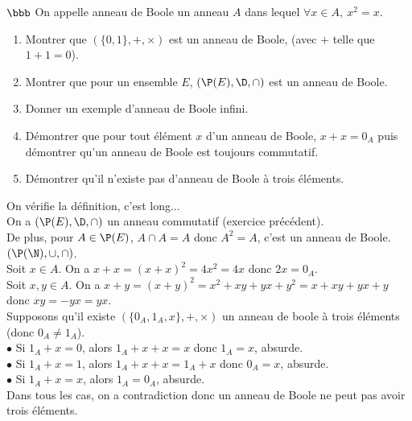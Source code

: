 \documentclass[11pt]{article}
\begin{document}
\begin{exercice}{$\bbb$}{}
    On appelle anneau de Boole un anneau $A$ dans lequel $\forall x \in A, ~ x^2 = x$.
    \begin{enumerate}
        \item Montrer que $(\{0,1\},+,\times)$ est un anneau de Boole, (avec $+$ telle que $1+1=0$).
        \item Montrer que pour un ensemble $E$, $(\P(E),\D,\cap)$ est un anneau de Boole.
        \item Donner un exemple d'anneau de Boole infini.
        \item Démontrer que pour tout élément $x$ d'un anneau de Boole, $x+x=0_A$ puis démontrer qu'un anneau de Boole est toujours commutatif.
        \item Démontrer qu'il n'existe pas d'anneau de Boole à trois éléments.
    \end{enumerate}
    \tcblower
     On vérifie la définition, c'est long...\\
     On a $(\P(E),\D,\cap)$ un anneau commutatif (exercice précédent).\\
    De plus, pour $A\in\P(E)$, $A\cap A=A$ donc $A^2=A$, c'est un anneau de Boole.\\
     $(\P(\N), \cup, \cap)$.\\
     Soit $x\in A$. On a $x+x=(x+x)^2=4x^2=4x$ donc $2x=0_A$.\\
    Soit $x,y\in A$. On a $x+y=(x+y)^2=x^2+xy+yx+y^2=x+xy+yx+y$ donc $xy=-yx=yx$.\\
     Supposons qu'il existe $(\{0_A,1_A,x\},+,\times)$ un anneau de boole à trois éléments (donc $0_A\neq1_A$).\\
    $\bullet$ Si $1_A+x=0$, alors $1_A+x+x=x$ donc $1_A=x$, absurde.\\
    $\bullet$ Si $1_A+x=1$, alors $1_A+x+x=1_A+x$ donc $0_A=x$, absurde.\\
    $\bullet$ Si $1_A+x=x$, alors $1_A=0_A$, absurde.\\
    Dans tous les cas, on a contradiction donc un anneau de Boole ne peut pas avoir trois éléments.
\end{exercice}
\end{document}
